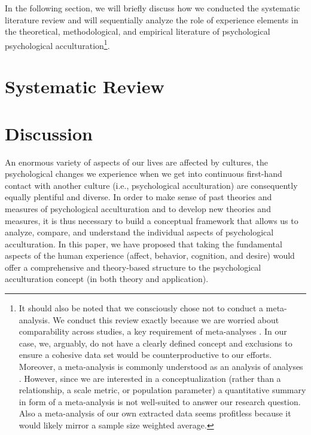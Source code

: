\documentclass[man, 12pt, a4paper, mask]{apa7}
\begin{document}
In the following section, we will briefly discuss how we conducted the systematic literature review and will sequentially analyze the role of experience elements in the theoretical, methodological, and empirical literature of psychological psychological acculturation\footnote{It should also be noted that we consciously chose not to conduct a meta-analysis. We conduct this review exactly because we are worried about comparability across studies, a key requirement of meta-analyses \citep{Pogue1998}. In our case, we, arguably, do not have a clearly defined concept and exclusions to ensure a cohesive data set would be counterproductive to our efforts. Moreover, a meta-analysis is commonly understood as an analysis of analyses \citep{Glass1976}. However, since we are interested in a conceptualization (rather than a relationship, a scale metric, or population parameter) a quantitative summary in form of a meta-analysis is not well-suited to answer our research question. Also a meta-analysis of our own extracted data seems profitless because it would likely mirror a sample size weighted average.}.

\section{Systematic Review}


\section{Discussion}
An enormous variety of aspects of our lives are affected by cultures, the psychological changes we experience when we get into continuous first-hand contact with another culture (i.e., psychological acculturation) are consequently equally plentiful and diverse.
In order to make sense of past theories and measures of psychological acculturation and to develop new theories and measures, it is thus necessary to build a conceptual framework that allows us to analyze, compare, and understand the individual aspects of psychological acculturation.
In this paper, we have proposed that taking the fundamental aspects of the human experience (affect, behavior, cognition, and desire) would offer a comprehensive and theory-based structure to the psychological acculturation concept (in both theory and application). 
\end{document}
